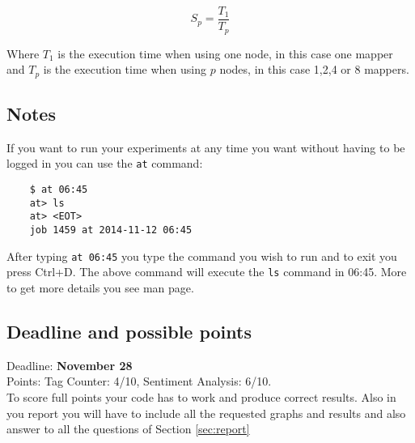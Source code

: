 \documentclass[a4paper,10pt]{article}
\begin{document}
  \[
  S_p = \frac{T_1}{T_p}
  \]
  
  Where $T_1$ is the execution time when using one node, in this case one mapper and $T_p$ is the execution time when using $p$ nodes, in this case 1,2,4 or 8 mappers.
  
  \subsection{Notes}
  If you want to run your experiments at any time you want without having to be logged in you can use the \texttt{at} command:
  
  \lstset{language=}      
  \begin{lstlisting}
    $ at 06:45
    at> ls 
    at> <EOT>
    job 1459 at 2014-11-12 06:45
  \end{lstlisting}
  After typing \texttt{at 06:45} you type the command you wish to run and to exit you press Ctrl+D. The above command will execute the \texttt{ls} command in 06:45. More to get more details you see man page. 
  
  
  \subsection{Deadline and possible points}
  Deadline: \textbf{November 28} \\
  Points: Tag Counter: 4/10, Sentiment Analysis: 6/10.  \\
  To score full points your code has to work and produce correct results. Also in you report you will have to include all the requested graphs and results and also answer to all the questions of Section \ref{sec:report}
\end{document}
